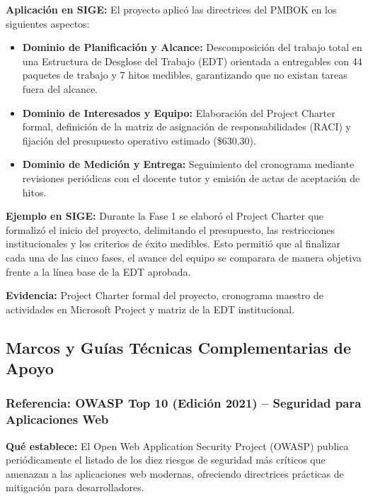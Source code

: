 \documentclass[12pt,a4paper]{article}
\begin{document}
\textbf{Aplicación en SIGE:}
El proyecto aplicó las directrices del PMBOK en los siguientes aspectos:
\begin{itemize}[leftmargin=1.5em, itemsep=2pt]
    \item \textbf{Dominio de Planificación y Alcance:} Descomposición del trabajo total en una Estructura de Desglose del Trabajo (EDT) orientada a entregables con 44 paquetes de trabajo y 7 hitos medibles, garantizando que no existan tareas fuera del alcance.
    \item \textbf{Dominio de Interesados y Equipo:} Elaboración del Project Charter formal, definición de la matriz de asignación de responsabilidades (RACI) y fijación del presupuesto operativo estimado (\$630.30).
    \item \textbf{Dominio de Medición y Entrega:} Seguimiento del cronograma mediante revisiones periódicas con el docente tutor y emisión de actas de aceptación de hitos.
\end{itemize}

\textbf{Ejemplo en SIGE:}
Durante la Fase 1 se elaboró el Project Charter que formalizó el inicio del proyecto, delimitando el presupuesto, las restricciones institucionales y los criterios de éxito medibles. Esto permitió que al finalizar cada una de las cinco fases, el avance del equipo se comparara de manera objetiva frente a la línea base de la EDT aprobada.

\textbf{Evidencia:}
Project Charter formal del proyecto, cronograma maestro de actividades en Microsoft Project y matriz de la EDT institucional.

\subsection{Marcos y Guías Técnicas Complementarias de Apoyo}

\subsubsection{Referencia: OWASP Top 10 (Edición 2021) -- Seguridad para Aplicaciones Web}

\textbf{Qué establece:}
El Open Web Application Security Project (OWASP) publica periódicamente el listado de los diez riesgos de seguridad más críticos que amenazan a las aplicaciones web modernas, ofreciendo directrices prácticas de mitigación para desarrolladores.
\end{document}
